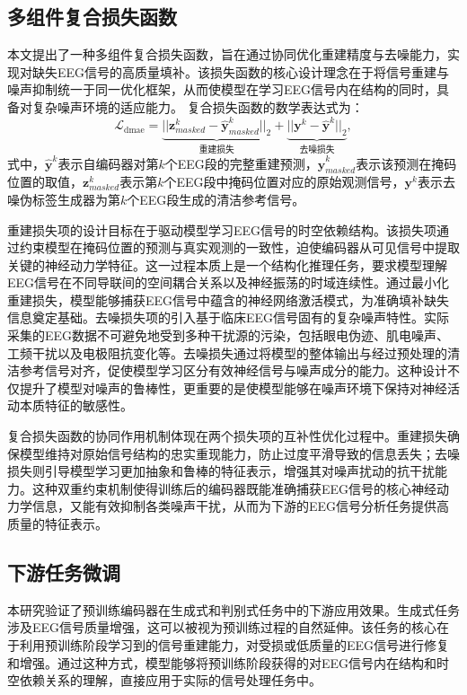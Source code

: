 \subsection{多组件复合损失函数}
本文提出了一种多组件复合损失函数，旨在通过协同优化重建精度与去噪能力，实现对缺失EEG信号的高质量填补。该损失函数的核心设计理念在于将信号重建与噪声抑制统一于同一优化框架，从而使模型在学习EEG信号内在结构的同时，具备对复杂噪声环境的适应能力。
复合损失函数的数学表达式为：
\begin{equation}
\mathcal{L}_{\text{dmae}} = \underbrace{||\mathbf{z}^k_{masked} - \mathbf{\hat{y}}^k_{masked}||_2}_{\text{重建损失}} + \underbrace{||\mathbf{y}^k - \mathbf{\hat{y}}^k||_2}_{\text{去噪损失}},
\end{equation}
式中，$\mathbf{\hat{y}}^k$表示自编码器对第$k$个EEG段的完整重建预测，$\mathbf{\hat{y}}^k_{masked}$表示该预测在掩码位置的取值，$\mathbf{z}^k_{masked}$表示第$k$个EEG段中掩码位置对应的原始观测信号，$\mathbf{y}^k$表示去噪伪标签生成器为第$k$个EEG段生成的清洁参考信号。

重建损失项的设计目标在于驱动模型学习EEG信号的时空依赖结构。该损失项通过约束模型在掩码位置的预测与真实观测的一致性，迫使编码器从可见信号中提取关键的神经动力学特征。这一过程本质上是一个结构化推理任务，要求模型理解EEG信号在不同导联间的空间耦合关系以及神经振荡的时域连续性。通过最小化重建损失，模型能够捕获EEG信号中蕴含的神经网络激活模式，为准确填补缺失信息奠定基础。去噪损失项的引入基于临床EEG信号固有的复杂噪声特性。实际采集的EEG数据不可避免地受到多种干扰源的污染，包括眼电伪迹、肌电噪声、工频干扰以及电极阻抗变化等。去噪损失通过将模型的整体输出与经过预处理的清洁参考信号对齐，促使模型学习区分有效神经信号与噪声成分的能力。这种设计不仅提升了模型对噪声的鲁棒性，更重要的是使模型能够在噪声环境下保持对神经活动本质特征的敏感性。


复合损失函数的协同作用机制体现在两个损失项的互补性优化过程中。重建损失确保模型维持对原始信号结构的忠实重现能力，防止过度平滑导致的信息丢失；去噪损失则引导模型学习更加抽象和鲁棒的特征表示，增强其对噪声扰动的抗干扰能力。这种双重约束机制使得训练后的编码器既能准确捕获EEG信号的核心神经动力学信息，又能有效抑制各类噪声干扰，从而为下游的EEG信号分析任务提供高质量的特征表示。

\subsection{下游任务微调}
本研究验证了预训练编码器在生成式和判别式任务中的下游应用效果。生成式任务涉及EEG信号质量增强，这可以被视为预训练过程的自然延伸。该任务的核心在于利用预训练阶段学习到的信号重建能力，对受损或低质量的EEG信号进行修复和增强。通过这种方式，模型能够将预训练阶段获得的对EEG信号内在结构和时空依赖关系的理解，直接应用于实际的信号处理任务中。

